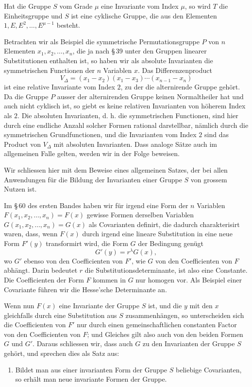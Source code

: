 \documentclass[11pt]{article}
\begin{document}
Hat die Gruppe $S$ vom Grade $\mu$ eine Invariante vom Index $\mu$, so wird $T$ die Einheitsgruppe und $S$ ist eine cyklische Gruppe, die aus den Elementen $1,E,E^2,\ldots,E^{\mu-1}$ besteht.

Betrachten wir als Beispiel die symmetrische Permutationsgruppe $P$ von $n$ Elementen $x_1,x_2,\ldots,x_n$, die ja nach \S\,39 unter den Gruppen linearer Substitutionen enthalten ist, so haben wir als absolute Invarianten die symmetrischen Functionen der $n$ Variablen $x$. Das Differenzenproduct
\[
V_\Delta=(x_1-x_2)(x_1-x_3)\cdots(x_{n-1}-x_n)
\]
ist eine relative Invariante vom Index $2$, zu der die alternirende Gruppe gehört. Da die Gruppe $P$ ausser der alternirenden Gruppe keinen Normaltheiler hat und auch nicht cyklisch ist, so giebt es keine relativen Invarianten von höherem Index als $2$. Die absoluten Invarianten, d. h. die symmetrischen Functionen, sind hier durch eine endliche Anzahl solcher Formen rational darstellbar, nämlich durch die symmetrischen Grundfunctionen, und die Invarianten vom Index $2$ sind das Product von $V_\Delta$ mit absoluten Invarianten. Dass analoge Sätze auch im allgemeinen Falle gelten, werden wir in der Folge beweisen.

Wir schliessen hier mit dem Beweise eines allgemeinen Satzes, der bei allen Anwendungen für die Bildung der Invarianten einer Gruppe $S$ von grossem Nutzen ist.

Im \S\,60 des ersten Bandes haben wir für irgend eine Form der $n$ Variablen $F(x_1,x_2,\ldots,x_n)=F(x)$ gewisse Formen derselben Variablen $G(x_1,x_2,\ldots,x_n)=G(x)$ als Covarianten definirt, die dadurch charakterisirt waren, dass, wenn $F(x)$ durch irgend eine lineare Substitution in eine neue Form $F'(y)$ transformirt wird, die Form $G$ der Bedingung genügt
\[
G'(y)=r^\lambda G(x),
\]
wo $G'$ ebenso von den Coefficienten von $F'$, wie $G$ von den Coefficienten von $F$ abhängt. Darin bedeutet $r$ die Substitutionsdeterminante, ist also eine Constante. Die Coefficienten der Form $F$ kommen in $G$ nur homogen vor. Als Beispiel einer Covariante führen wir die Hesse'sche Determinante an.

Wenn nun $F(x)$ eine Invariante der Gruppe $S$ ist, und die $y$ mit den $x$ gleichfalls durch eine Substitution aus $S$ zusammenhängen, so unterscheiden sich die Coefficienten von $F'$ nur durch einen gemeinschaftlichen constanten Factor von den Coefficienten von $F$; und Gleiches gilt also auch von den beiden Formen $G$ und $G'$. Daraus schliessen wir, dass auch $G$ zu den Invarianten der Gruppe $S$ gehört, und sprechen dies als Satz aus:
\begin{enumerate}[label=\arabic*.,leftmargin=2.2em,start=4]
\item Bildet man aus einer invarianten Form der Gruppe $S$ beliebige Covarianten, so erhält man neue invariante Formen der Gruppe.
\end{enumerate}
\end{document}
